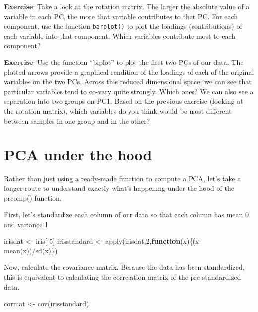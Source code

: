 \documentclass[
]{book}
\newenvironment{Shaded}{\begin{snugshade}}{\end{snugshade}}
\newcommand{\ControlFlowTok}[1]{\textcolor[rgb]{0.13,0.29,0.53}{\textbf{#1}}}
\newcommand{\DecValTok}[1]{\textcolor[rgb]{0.00,0.00,0.81}{#1}}
\newcommand{\FunctionTok}[1]{\textcolor[rgb]{0.00,0.00,0.00}{#1}}
\newcommand{\NormalTok}[1]{#1}
\newcommand{\OtherTok}[1]{\textcolor[rgb]{0.56,0.35,0.01}{#1}}
\newcommand{\SpecialCharTok}[1]{\textcolor[rgb]{0.00,0.00,0.00}{#1}}
\begin{document}
\textbf{Exercise}: Take a look at the rotation matrix. The larger the absolute value of a variable in each PC, the more that variable contributes to that PC. For each component, use the function \texttt{barplot()} to plot the loadings (contributions) of each variable into that component. Which variables contribute most to each component?

\textbf{Exercise}: Use the function ``biplot'' to plot the first two PCs of our data. The plotted arrows provide a graphical rendition of the loadings of each of the original variables on the two PCs. Across this reduced dimensional space, we can see that particular variables tend to co-vary quite strongly. Which ones? We can also see a separation into two groups on PC1. Based on the previous exercise (looking at the rotation matrix), which variables do you think would be most different between samples in one group and in the other?

\hypertarget{pca-under-the-hood}{%
\section{PCA under the hood}\label{pca-under-the-hood}}

Rather than just using a ready-made function to compute a PCA, let's take a longer route to understand exactly what's happening under the hood of the prcomp() function.

First, let's standardize each column of our data so that each column has mean 0 and variance 1

\begin{Shaded}
\begin{Highlighting}[]
\NormalTok{irisdat }\OtherTok{\textless{}{-}}\NormalTok{ iris[}\SpecialCharTok{{-}}\DecValTok{5}\NormalTok{]}
\NormalTok{irisstandard }\OtherTok{\textless{}{-}} \FunctionTok{apply}\NormalTok{(irisdat,}\DecValTok{2}\NormalTok{,}\ControlFlowTok{function}\NormalTok{(x)\{(x}\SpecialCharTok{{-}}\FunctionTok{mean}\NormalTok{(x))}\SpecialCharTok{/}\FunctionTok{sd}\NormalTok{(x)\})}
\end{Highlighting}
\end{Shaded}

Now, calculate the covariance matrix. Because the data has been standardized, this is equivalent to calculating the correlation matrix of the pre-standardized data.

\begin{Shaded}
\begin{Highlighting}[]
\NormalTok{cormat }\OtherTok{\textless{}{-}} \FunctionTok{cov}\NormalTok{(irisstandard)}
\end{Highlighting}
\end{Shaded}
\end{document}
